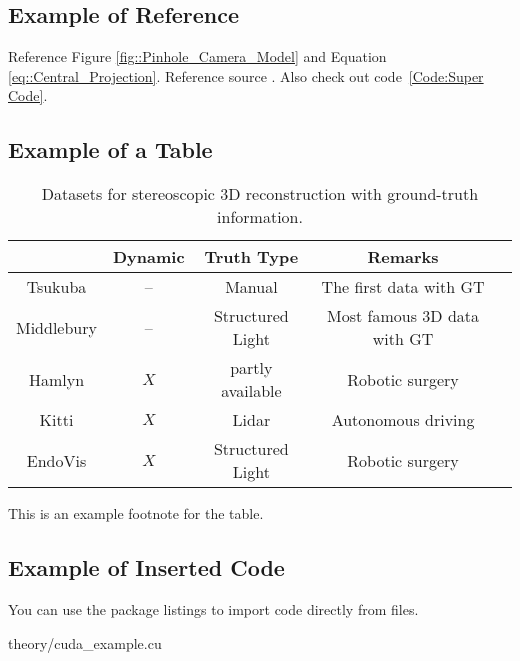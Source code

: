 \documentclass[class=scrbook, crop=false]{standalone}
\begin{document}
    \subsection{Example of Reference}
    Reference Figure \ref{fig::Pinhole_Camera_Model} and Equation \ref{eq::Central_Projection}.
    Reference source \cite{3D_introductorytechniques}. Also check out code~\ref{Code:Super Code}.

    \subsection{Example of a Table}
    \begin{table*}[ht]
        \centering
        \caption[Datasets for 3D reconstruction]{Datasets for stereoscopic 3D reconstruction with ground-truth information.}
        \label{Table::Dataset_attributes}
        \begin{tabular}{|c|c|c|c|c|}
            \hline
            ~                        & Dynamic & Truth Type       & Remarks\\
            \hline
            \color{blue} Tsukuba      & --      & Manual           & The first data with GT\\
            \color{orange} Middlebury & --      & Structured Light & Most famous 3D data with GT \\
            \color{red} Hamlyn        & $X$     & partly available & Robotic surgery\\
            \color{cyan} Kitti        & $X$     & Lidar            & Autonomous driving\\
            \color{green} EndoVis     & $X$     & Structured Light & Robotic surgery\\
            \hline
        \end{tabular}
        \begin{tablenotes}
            \small
            \item * This is an example footnote for the table.
        \end{tablenotes}
    \end{table*}

    \subsection{Example of Inserted Code}
    \label{Section::Insert_Code}
    You can use the package listings to import code directly from files. 
    
    {theory/cuda_example.cu}
\end{document}
